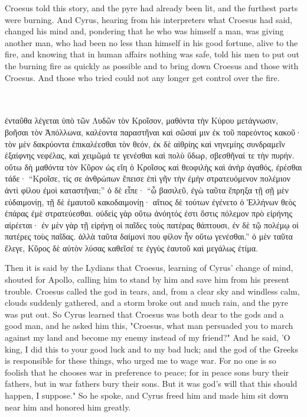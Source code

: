 \documentclass{article}
\begin{document}
Croesus told this story, and the pyre had already been lit, and the furthest parts were burning.
And Cyrus, hearing from his interpreters what Croesus had said, changed his mind
and, pondering that he who was himself a man, was giving another man,
who had been no less than himself in his good fortune, alive to the fire,
and knowing that in human affairs nothing was safe, told his men to put out the burning fire as quickly as possible
and to bring down Croesus and those with Croesus.
And those who tried could not any longer get control over the fire. \\ \\ \\

\begin{greek}
ἐνταῦθα λέγεται ὑπὸ τῶν Λυδῶν τὸν Κροῖσον, μαθόντα τὴν Κύρου μετάγνωσιν,
βοῆσαι τὸν Ἀπόλλωνα, καλέοντα παραστῆναι καὶ σῶσαί μιν ἐκ τοῦ παρεόντος κακοῦ·
τὸν μὲν δακρύοντα ἐπικαλέεσθαι τὸν θεόν,
ἐκ δὲ αἰθρίης καὶ νηνεμίης συνδραμεῖν ἐξαίφνης νεφέλας,
καὶ χειμῶμά τε γενέσθαι καὶ πολὺ ὕδωρ, σβεσθῆναί τε τὴν πυρήν.
οὕτω δὴ μαθόντα τὸν Κῦρον ὡς εἴη ὁ Κροῖσος καὶ θεοφιλὴς καὶ ἀνὴρ ἀγαθός, ἐρέσθαι τάδε·
“Κροῖσε, τίς σε ἀνθρώπων ἔπεισε ἐπὶ γῆν τὴν ἐμὴν στρατευόμενον πολέμιον ἀντὶ φίλου ἐμοὶ καταστῆναι;”
ὁ δὲ εἶπε· “ὦ βασιλεῦ, ἐγὼ ταῦτα ἔπρηξα τῇ σῇ μὲν εὐδαιμονίῃ, τῇ δὲ ἑμαυτοῦ κακοδαιμονίῃ·
αἴτιος δὲ τούτων ἐγένετο ὁ Ἑλλήνων θεὸς ἐπάρας ἐμὲ στρατεύεσθαι.
οὐδεὶς γὰρ οὕτω ἀνόητός ἐστι ὅστις πόλεμον πρὸ εἰρήνης αἱρέεται·
ἐν μὲν γὰρ τῇ εἰρήνῃ οἱ παῖδες τοὺς πατέρας θάπτουσι,
ἐν δὲ τῷ πολέμῳ οἱ πατέρες τοὺς παῖδας. ἀλλὰ ταῦτα δαίμονί που φίλον ἦν οὕτω γενέσθαι.”
ὁ μὲν ταῦτα ἔλεγε, Κῦρος δὲ αὐτὸν λύσας καθεῖσέ τε ἐγγὺς ἑαυτοῦ καὶ μεγάλως ἐτίμα. \\
\end{greek}


Then it is said by the Lydians that Croesus, learning of Cyrus' change of mind, shouted for Apollo,
calling him to stand by him and save him from his present trouble.
Croesus called the god in tears, and, from a clear sky and windless calm,
clouds suddenly gathered, and a storm broke out and much rain, and the pyre was put out.
So Cyrus learned that Croesus was both dear to the gods and a good man,
and he asked him this, "Croesus, what man persuaded you to march against my land and become my enemy instead of my friend?"
And he said, 'O king, Ι did this to your good luck and to my bad luck;
and the god of the Greeks is responsible for these things, who urged me to wage war.
For no one is so foolish that he chooses war in preference to peace;
for in peace sons bury their fathers, but in war fathers bury their sons.
But it was god's will  that this should happen, Ι suppose."
So he spoke, and Cyrus freed him and made him sit down near him and honored him greatly.
\end{document}
